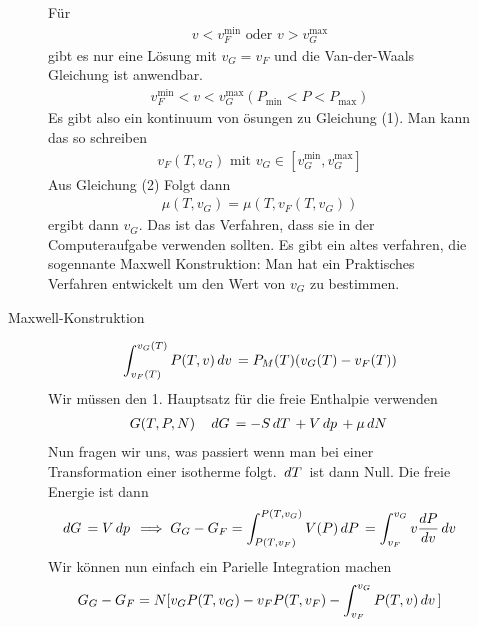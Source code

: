 \begin{description}
\begin{description}
       F\"ur 
       \begin{align*}
         v < v_F^\text{min} \text{ oder } v > v_G ^\text{max}
       \end{align*}
       gibt es nur eine L\"osung mit $v_G = v_F$ und die Van-der-Waals Gleichung
       ist anwendbar.
       \begin{align*}
         v_F^\text{min} < v < v_G^\text{max} ( P_\text{min} < P < P_\text{max})
       \end{align*}
       Es gibt also ein kontinuum von \"osungen zu Gleichung (1). Man kann
       das so schreiben
       \begin{align*}
         v_F(T, v_G) \text{ mit } v_G \in [v_G^\text{min}, v_G^\text{max}]
       \end{align*}
       Aus Gleichung (2) Folgt dann
       \begin{align*}
         \mu(T, v_G) = \mu(T, v_F(T, v_G)) 
       \end{align*}
       ergibt dann $v_G$. Das ist das Verfahren, dass sie in der Computeraufgabe
       verwenden sollten. Es gibt ein altes verfahren, die sogennante Maxwell
       Konstruktion: Man hat ein Praktisches Verfahren entwickelt um den Wert
       von $v_G$ zu bestimmen.
     \item[Maxwell-Konstruktion] 
       \begin{align*}
         \int_{v_F(T)}^{v_G(T)} P(T, v) \,dv\, = 
         P_M(T) (v_G(T) - v_F(T))
       \end{align*}
       Wir m\"ussen den 1. Hauptsatz f\"ur die freie Enthalpie verwenden
       \begin{align*}
         G(T, P, N) && \,dG\, = - S \,dT\, + V \,dp\, + \mu \,dN\,
       \end{align*}
       Nun fragen wir uns, was passiert wenn man bei einer Transformation
       einer isotherme folgt. $ \,dT \,$ ist dann Null. Die freie Energie
       ist dann %
       \begin{align*}
         \,dG\, = V \,dp\, \implies G_G - G_F =
         \int_{P(T, v_F)}^{P(T, v_G)} V(P) \,dP\,  =
         \int_{v_F}^{v_G} v \frac{d{P}}{d{v}} \,dv\,
       \end{align*}
       Wir k\"onnen nun einfach ein Parielle Integration machen
       \begin{align*}
         G_G - G_F = N[v_G P(T, v_G) - v_F P(T, v_F) - 
         \int_{v_F}^{v_G} P(T, v) \d{v} ] 

\end{align*}
\end{description}
\end{description}
